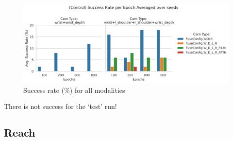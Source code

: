 \begin{figure}[H]
  \centering
  \includegraphics[width=\linewidth]{assets/evaluation/derivatives/grasp-normal-control-success-cams.png}
  \caption{Success rate (\%) for all modalities}\label{fig:derivatives-all-cams-success}
\end{figure}

There is not success for the `test' run!

\subsection{Reach}
